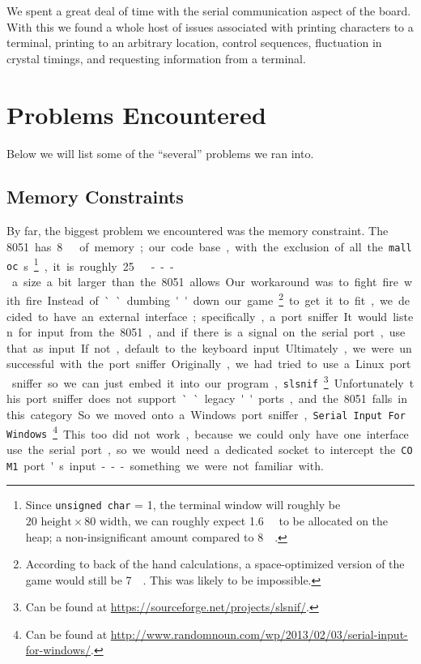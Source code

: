 \documentclass[12pt]{article}
\newcommand{\shellcmd}[1]{\texttt{\colorbox{gray!30}{#1}}}
\begin{document}
We spent a great deal of time with the serial communication aspect of the board. With this we found a whole host of issues associated with printing characters to a terminal, printing to an arbitrary location, control sequences, fluctuation in crystal timings, and requesting information from a terminal.

\section{Problems Encountered}
Below we will list some of the ``several'' problems we ran into.

\subsection{Memory Constraints}
By far, the biggest problem we encountered was the memory constraint. The \SI{8051} has \SI{8}{\kilo\byte} of memory; our code base, with the exclusion of all the \shellcmd{malloc}s\footnote{Since \shellcmd{unsigned char} = \SI{1}{\byte}, the terminal window will roughly be $20\text{ height} \times 80\text{ width} $, we can roughly expect \SI{1.6}{\kilo\byte} to be allocated on the heap; a non-insignificant amount compared to \SI{8}{\kilo\byte}.}, it is roughly \SI{25}{\kilo\byte} --- a size a bit larger than the \num{8051} allows. Our workaround was to fight fire with fire.

Instead of ``dumbing'' down our game\footnote{According to back of the hand calculations, a space-optimized version of the game would still be \SI{7}{\kilo\byte}. This was likely to be impossible.} to get it to fit, we decided to have an external interface; specifically, a port sniffer. It would listen for input from the \num{8051}, and if there is a signal on the serial port, use that as input. If not, default to the keyboard input.

Ultimately, we were unsuccessful with the port sniffer. Originally, we had tried to use a Linux port sniffer so we can just embed it into our program, \shellcmd{slsnif}\footnote{Can be found at \url{https://sourceforge.net/projects/slsnif/}.}. Unfortunately this port sniffer does not support ``legacy'' ports, and the \num{8051} falls in this category. So we moved onto a Windows port sniffer, \shellcmd{Serial Input For Windows}\footnote{Can be found at \url{http://www.randomnoun.com/wp/2013/02/03/serial-input-for-windows/}.}. This too did not work, because we could only have one interface use the serial port, so we would need a dedicated socket to intercept the \shellcmd{COM1} port's input --- something we were not familiar with.
\end{document}
